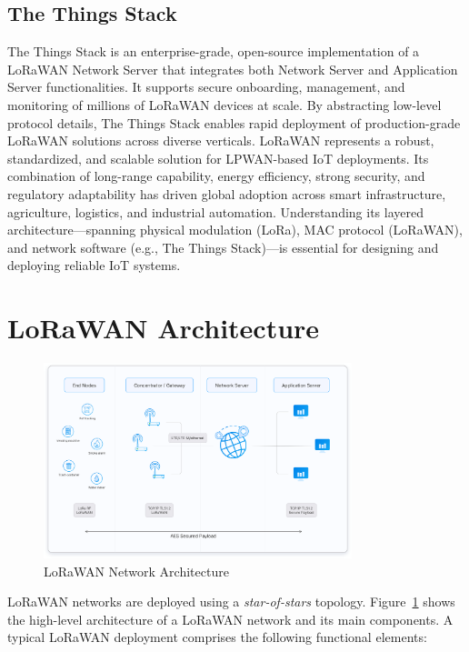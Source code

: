 \subsection{The Things Stack}
The Things Stack is an enterprise-grade, open-source implementation of a LoRaWAN Network Server that integrates both Network Server and Application Server functionalities. It supports secure onboarding, management, and monitoring of millions of LoRaWAN devices at scale. By abstracting low-level protocol details, The Things Stack enables rapid deployment of production-grade LoRaWAN solutions across diverse verticals.
LoRaWAN represents a robust, standardized, and scalable solution for LPWAN-based IoT deployments. Its combination of long-range capability, energy efficiency, strong security, and regulatory adaptability has driven global adoption across smart infrastructure, agriculture, logistics, and industrial automation. Understanding its layered architecture—spanning physical modulation (LoRa), MAC protocol (LoRaWAN), and network software (e.g., The Things Stack)—is essential for designing and deploying reliable IoT systems.



\section{LoRaWAN Architecture}
\begin{figure}
    \centering
    \includegraphics[width=0.8\textwidth]{figures/architecture_ttn.png}
    \caption{LoRaWAN Network Architecture}
    \label{fig:lora_architecture}
\end{figure}

LoRaWAN networks are deployed using a \emph{star-of-stars} topology.
Figure~\ref{fig:lora_architecture} shows the high-level architecture of a LoRaWAN network and its main components.
A typical LoRaWAN deployment comprises the following functional elements:

